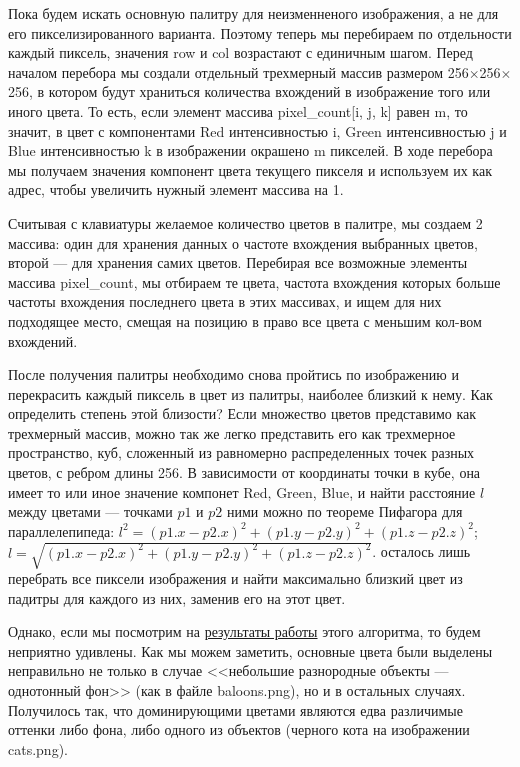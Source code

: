 \documentclass[12pt]{article}
\begin{document}
{	
	
	Пока будем искать основную палитру для неизменненого изображения, а не для его пикселизированного варианта. Поэтому теперь мы перебираем по отдельности каждый пиксель, значения row и col возрастают с единичным шагом. Перед началом перебора мы создали отдельный трехмерный массив размером 256$\times$256$\times$256, в котором будут храниться количества вхождений в изображение того или иного цвета. То есть, если элемент массива pixel\_count[i, j, k] равен m, то значит, в цвет с компонентами Red интенсивностью i, Green интенсивностью j и Blue интенсивностью k в изображении окрашено m пикселей. В ходе перебора мы получаем значения компонент цвета текущего пикселя и используем их как адрес, чтобы увеличить нужный элемент массива на 1.
	
	Считывая с клавиатуры желаемое количество цветов в палитре, мы создаем 2 массива: один для хранения данных о частоте вхождения выбранных цветов, второй --- для хранения самих цветов. Перебирая все возможные элементы массива pixel\_count, мы отбираем те цвета, частота вхождения которых больше частоты вхождения последнего цвета в этих массивах, и ищем для них подходящее место, смещая на позицию в право все цвета с меньшим кол-вом вхождений.
	
	После получения палитры необходимо снова пройтись по изображению и перекрасить каждый пиксель в цвет из палитры, наиболее близкий к нему. Как определить степень этой близости? Если множество цветов представимо как трехмерный массив, можно так же легко представить его как трехмерное пространство, куб, сложенный из равномерно распределенных точек разных цветов, с ребром длины 256. В зависимости от координаты точки в кубе, она имеет то или иное значение компонет Red, Green, Blue, и найти расстояние $l$ между цветами --- точками $p1$ и $p2$ ними можно по теореме Пифагора для параллелепипеда: $l^2 = (p1.x-p2.x)^2 + (p1.y-p2.y)^2 +(p1.z-p2.z)^2$; $l = \sqrt{(p1.x-p2.x)^2 + (p1.y-p2.y)^2 +(p1.z-p2.z)^2}$. осталось лишь перебрать все пиксели изображения и найти максимально близкий цвет из падитры для каждого из них, заменив его на этот цвет.
	
	Однако, если мы посмотрим на \hyperref[reduced_cats]{результаты работы} этого алгоритма, то будем неприятно удивлены. Как мы можем заметить, основные цвета были выделены неправильно не только в случае <<небольшие разнородные объекты --- однотонный фон>> (как в файле baloons.png), но и в остальных случаях. Получилось так, что доминирующими цветами являются едва различимые оттенки либо фона, либо одного из объектов (черного кота на изображении cats.png).
	
}
\end{document}
